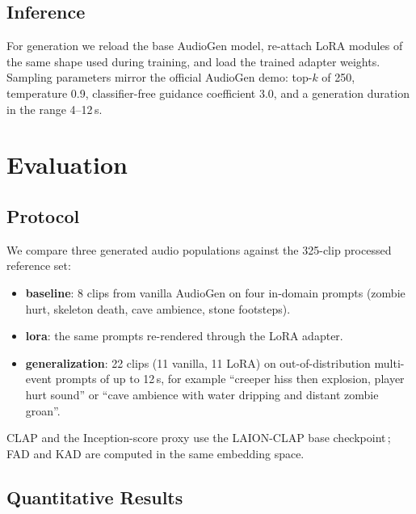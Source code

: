 \documentclass[conference]{IEEEtran}
\begin{document}
\subsection{Inference}

For generation we reload the base AudioGen model, re-attach LoRA modules
of the same shape used during training, and load the trained adapter
weights. Sampling parameters mirror the official AudioGen demo: top-$k$
of 250, temperature 0.9, classifier-free guidance coefficient 3.0, and a
generation duration in the range 4--12\,s.

\section{Evaluation}

\subsection{Protocol}

We compare three generated audio populations against the 325-clip
processed reference set:

\begin{itemize}
\item \textbf{baseline}: 8 clips from vanilla AudioGen on four in-domain
prompts (zombie hurt, skeleton death, cave ambience, stone footsteps).
\item \textbf{lora}: the same prompts re-rendered through the LoRA
adapter.
\item \textbf{generalization}: 22 clips (11 vanilla, 11 LoRA) on
out-of-distribution multi-event prompts of up to 12\,s, for example
``creeper hiss then explosion, player hurt sound'' or ``cave ambience
with water dripping and distant zombie groan''.
\end{itemize}

CLAP and the Inception-score proxy use the LAION-CLAP base
checkpoint\,\cite{wu2023clap}; FAD and KAD are computed in the same
embedding space.

\subsection{Quantitative Results}
\end{document}
